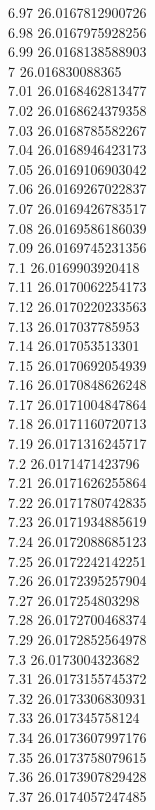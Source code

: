{6.97	26.0167812900726\\
6.98	26.0167975928256\\
6.99	26.0168138588903\\
7	26.016830088365\\
7.01	26.0168462813477\\
7.02	26.0168624379358\\
7.03	26.0168785582267\\
7.04	26.0168946423173\\
7.05	26.0169106903042\\
7.06	26.0169267022837\\
7.07	26.0169426783517\\
7.08	26.0169586186039\\
7.09	26.0169745231356\\
7.1	26.0169903920418\\
7.11	26.0170062254173\\
7.12	26.0170220233563\\
7.13	26.017037785953\\
7.14	26.017053513301\\
7.15	26.0170692054939\\
7.16	26.0170848626248\\
7.17	26.0171004847864\\
7.18	26.0171160720713\\
7.19	26.0171316245717\\
7.2	26.0171471423796\\
7.21	26.0171626255864\\
7.22	26.0171780742835\\
7.23	26.0171934885619\\
7.24	26.0172088685123\\
7.25	26.0172242142251\\
7.26	26.0172395257904\\
7.27	26.017254803298\\
7.28	26.0172700468374\\
7.29	26.0172852564978\\
7.3	26.0173004323682\\
7.31	26.0173155745372\\
7.32	26.0173306830931\\
7.33	26.017345758124\\
7.34	26.0173607997176\\
7.35	26.0173758079615\\
7.36	26.0173907829428\\
7.37	26.0174057247485\\
}
